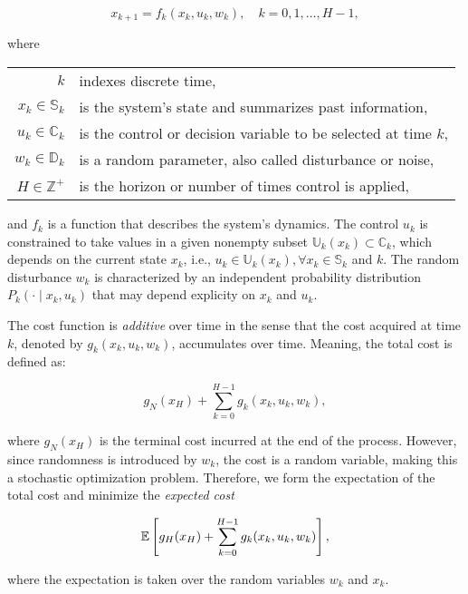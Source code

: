 \begin{equation*}
  x_{k+1} = f_k(x_k, u_k, w_k), \quad k = 0,1,\dots,H-1,
\end{equation*}

where

\begin{table}[h]
  \centering
  \begin{tabular}{rl}
    $k$ & indexes discrete time, \\
    $x_k \in \mathbb{S}_k$  & is the system's state and summarizes past information, \\
    $u_k \in \mathbb{C}_k$ & is the control or decision variable to be selected at time $k$, \\
    $w_k \in \mathbb{D}_k$ & is a random parameter, also called disturbance or noise, \\
    $H \in \mathbb{Z}^+$ & is the horizon or number of times control is applied, 
  \end{tabular}
\end{table}

and $f_k$ is a function that describes the system's dynamics. The control $u_k$
is constrained to take values in a given nonempty subset $\mathbb{U}_k(x_k)
\subset \mathbb{C}_k$, which depends on the current state $x_k$, i.e., $u_k \in
\mathbb{U}_k(x_k), \forall x_k \in \mathbb{S}_k$ and $k$. The random disturbance
$w_k$ is characterized by an independent probability distribution $P_k(\cdot\mid
x_k,u_k)$ that may depend explicity on $x_k$ and $u_k$.

The cost function is \textit{additive} over time in the sense that the cost
acquired at time $k$, denoted by $g_k(x_k, u_k, w_k)$, accumulates over time.
Meaning, the total cost is defined as:

\begin{equation*}
  g_N(x_H) + \sum\limits_{k=0}^{H-1}{g_k(x_k, u_k, w_k)},
\end{equation*}

where $g_N(x_H)$ is the terminal cost incurred at the end of the process.
However, since randomness is introduced by $w_k$, the cost is a random variable,
making this a stochastic optimization problem. Therefore, we form the
expectation of the total cost and minimize the \textit{expected cost}

\begin{equation*}
  \mathbb{E}\left[g_H(x_H) + \sum\limits_{k=0}^{H-1}{g_k(x_k, u_k, w_k)}\right],
\end{equation*}

where the expectation is taken over the random variables $w_k$ and $x_k$.

